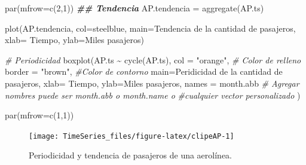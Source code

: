 \documentclass[
  spanish,
]{book}
\newenvironment{Shaded}{\begin{snugshade}}{\end{snugshade}}
\newcommand{\AttributeTok}[1]{\textcolor[rgb]{0.77,0.63,0.00}{#1}}
\newcommand{\CommentTok}[1]{\textcolor[rgb]{0.56,0.35,0.01}{\textit{#1}}}
\newcommand{\DecValTok}[1]{\textcolor[rgb]{0.00,0.00,0.81}{#1}}
\newcommand{\DocumentationTok}[1]{\textcolor[rgb]{0.56,0.35,0.01}{\textbf{\textit{#1}}}}
\newcommand{\FunctionTok}[1]{\textcolor[rgb]{0.00,0.00,0.00}{#1}}
\newcommand{\NormalTok}[1]{#1}
\newcommand{\OtherTok}[1]{\textcolor[rgb]{0.56,0.35,0.01}{#1}}
\newcommand{\SpecialCharTok}[1]{\textcolor[rgb]{0.00,0.00,0.00}{#1}}
\newcommand{\StringTok}[1]{\textcolor[rgb]{0.31,0.60,0.02}{#1}}
\theoremstyle{remark}
\begin{document}
\begin{Shaded}
\begin{Highlighting}[]
\FunctionTok{par}\NormalTok{(}\AttributeTok{mfrow=}\FunctionTok{c}\NormalTok{(}\DecValTok{2}\NormalTok{,}\DecValTok{1}\NormalTok{))}
\DocumentationTok{\#\# Tendencia}
\NormalTok{AP.tendencia }\OtherTok{=} \FunctionTok{aggregate}\NormalTok{(AP.ts)}

\FunctionTok{plot}\NormalTok{(AP.tendencia, }\AttributeTok{col=}\StringTok{\textquotesingle{}steelblue\textquotesingle{}}\NormalTok{, }
    \AttributeTok{main=}\StringTok{\textquotesingle{}Tendencia de la cantidad de pasajeros\textquotesingle{}}\NormalTok{,}
    \AttributeTok{xlab=} \StringTok{\textquotesingle{}Tiempo\textquotesingle{}}\NormalTok{,}
    \AttributeTok{ylab=}\StringTok{\textquotesingle{}Miles pasajeros\textquotesingle{}}\NormalTok{)}

\CommentTok{\# Periodicidad}
\FunctionTok{boxplot}\NormalTok{(AP.ts }\SpecialCharTok{\textasciitilde{}} \FunctionTok{cycle}\NormalTok{(AP.ts),}
        \AttributeTok{col =} \StringTok{"orange"}\NormalTok{, }\CommentTok{\# Color de relleno}
        \AttributeTok{border =} \StringTok{"brown"}\NormalTok{, }\CommentTok{\#Color de contorno}
        \AttributeTok{main=}\StringTok{\textquotesingle{}Peridicidad de la cantidad de pasajeros\textquotesingle{}}\NormalTok{,}
        \AttributeTok{xlab=} \StringTok{\textquotesingle{}Tiempo\textquotesingle{}}\NormalTok{,}
        \AttributeTok{ylab=}\StringTok{\textquotesingle{}Miles pasajeros\textquotesingle{}}\NormalTok{,}
        \AttributeTok{names =}\NormalTok{ month.abb }\CommentTok{\# Agregar nombres puede ser month.abb o month.name o }
                          \CommentTok{\#cualquier vector personalizado}
\NormalTok{        )}

\FunctionTok{par}\NormalTok{(}\AttributeTok{mfrow=}\FunctionTok{c}\NormalTok{(}\DecValTok{1}\NormalTok{,}\DecValTok{1}\NormalTok{))}
\end{Highlighting}
\end{Shaded}

\begin{figure}

{\centering \texttt{[image: TimeSeries\_files/figure-latex/clipeAP-1]} 

}

\caption{Periodicidad y tendencia de pasajeros de una aerolínea.}\label{fig:clipeAP}
\end{figure}
\end{document}
